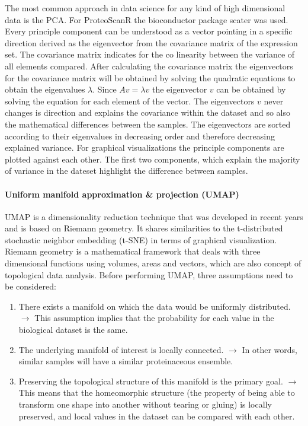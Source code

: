 \documentclass[
  11pt,
]{article}
\begin{document}
The most common approach in data science for any kind of high dimensional data is the PCA. For ProteoScanR the bioconductor package scater \citep{McCarthy2017} was used. Every principle component can be understood as a vector pointing in a specific direction derived as the eigenvector from the covariance matrix of the expression set. The covariance matrix indicates for the co linearity between the variance of all elements compared. After calculating the covariance matrix the eigenvectors for the covariance matrix will be obtained by solving the quadratic equations to obtain the eigenvalues \(\lambda\). Since \(A v = \lambda v\) the eigenvector \(v\) can be obtained by solving the equation for each element of the vector. The eigenvectors \(v\) never changes is direction and explains the covariance within the dataset and so also the mathematical differences between the samples. The eigenvectors are sorted according to their eigenvalues in decreasing order and therefore decreasing explained variance. For graphical visualizations the principle components are plotted against each other. The first two components, which explain the majority of variance in the dateset highlight the difference between samples.

\hypertarget{uniform-manifold-approximation-projection-umap}{%
\paragraph{Uniform manifold approximation \& projection (UMAP)}\label{uniform-manifold-approximation-projection-umap}}

UMAP \citep{McInnes2018} is a dimensionality reduction technique that was developed in recent years and is based on Riemann geometry. It shares similarities to the t-distributed stochastic neighbor embedding (t-SNE) in terms of graphical visualization. Riemann geometry is a mathematical framework that deals with three dimensional functions using volumes, areas and vectors, which are also concept of topological data analysis.
Before performing UMAP, three assumptions need to be considered:

\begin{enumerate}
\item There exists a manifold on which the data would be uniformly distributed.
$\rightarrow$ This assumption implies that the probability for each value in the biological dataset is the same.

\item The underlying manifold of interest is locally connected.
$\rightarrow$ In other words, similar samples will have a similar proteinaceous ensemble.

\item Preserving the topological structure of this manifold is the primary
goal.
$\rightarrow$ This means that the homeomorphic structure (the property of being able to transform one shape into another without tearing or gluing) is locally preserved, and local values in the dataset can be compared with each other.
\end{enumerate}
\end{document}
